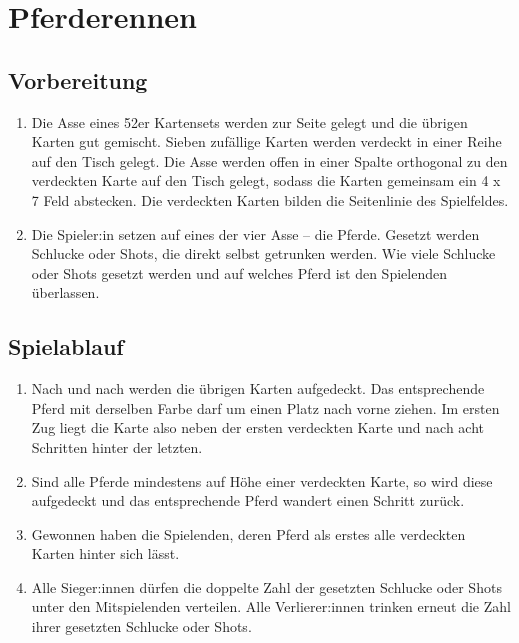 \chapter{Pferderennen}
\section{Vorbereitung}
\begin{enumerate}[label={(\arabic*)}]    
    \item
    Die Asse eines 52er Kartensets werden zur Seite gelegt und die übrigen Karten gut gemischt.
    Sieben zufällige Karten werden verdeckt in einer Reihe auf den Tisch gelegt.
    Die Asse werden offen in einer Spalte orthogonal zu den verdeckten Karte auf den Tisch gelegt, sodass die Karten gemeinsam ein 4 x 7 Feld abstecken.
    Die verdeckten Karten bilden die Seitenlinie des Spielfeldes.

    \item
    Die Spieler:in setzen auf eines der vier Asse – die \glqq{}Pferde\grqq{}.
    Gesetzt werden Schlucke oder Shots, die direkt selbst getrunken werden.
    Wie viele Schlucke oder Shots gesetzt werden und auf welches Pferd ist den Spielenden überlassen.
\end{enumerate}

\section{Spielablauf}
\begin{enumerate}[label={(\arabic*)}]
    \item
    Nach und nach werden die übrigen Karten aufgedeckt.
    Das entsprechende Pferd mit derselben Farbe darf um einen Platz nach vorne ziehen.
    Im ersten Zug liegt die Karte also neben der ersten verdeckten Karte und nach acht Schritten hinter der letzten.

    \item
    Sind alle Pferde mindestens auf Höhe einer verdeckten Karte, so wird diese aufgedeckt und das entsprechende Pferd wandert einen Schritt zurück.

    \item
    Gewonnen haben die Spielenden, deren Pferd als erstes alle verdeckten Karten hinter sich lässt.

    \item
    Alle Sieger:innen dürfen die doppelte Zahl der gesetzten Schlucke oder Shots unter den Mitspielenden verteilen.
    Alle Verlierer:innen trinken erneut die Zahl ihrer gesetzten Schlucke oder Shots.
\end{enumerate}
